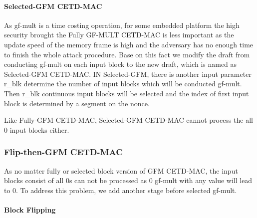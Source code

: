 \paragraph{Selected-GFM CETD-MAC}
As gf-mult is a time costing operation, for some embedded platform the high security brought the Fully GF-MULT CETD-MAC is less important as the update speed of the memory frame is high and the adversary has no enough time to finish the whole attack procedure. Base on this fact we modify the draft from conducting gf-mult on each input block to the new draft, which is named as Selected-GFM CETD-MAC. IN Selected-GFM, there is another input parameter r\_blk determine the number of input blocks which will be conducted gf-mult. Then r\_blk continuous input blocks will be selected and the index of first input block is determined by a segment on the nonce. 

Like Fully-GFM CETD-MAC, Selected-GFM CETD-MAC cannot process the all 0 input blocks either.
\subsubsection{Flip-then-GFM CETD-MAC}
As no matter fully or selected block version of GFM CETD-MAC, the input blocks consist of all 0s can not be processed as 0 gf-mult with any value will lead to 0. To address this  problem, we add another stage before selected gf-mult.
\paragraph{Block Flipping}
